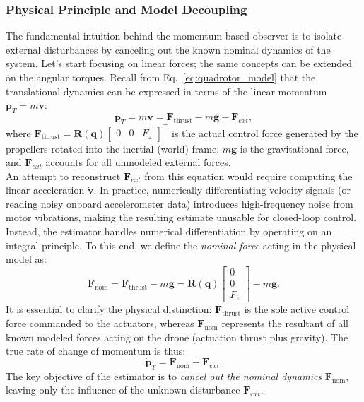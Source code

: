 \subsubsection{Physical Principle and Model Decoupling}
The fundamental intuition behind the momentum-based observer is to isolate external disturbances by canceling out the known nominal dynamics of the system. Let's start focusing on linear forces; the same concepts can be extended on the angular torques. Recall from Eq.~\eqref{eq:quadrotor_model} that the translational dynamics can be expressed in terms of the linear momentum $\mathbf{p}_T = m \mathbf{v}$:
\begin{equation}
    \dot{\mathbf{p}}_T = m \dot{\mathbf{v}} = \mathbf{F}_{\text{thrust}} - m\mathbf{g} + \mathbf{F}_{ext},
\end{equation}
where $\mathbf{F}_{\text{thrust}} = \mathbf{R}(\mathbf{q}) \begin{bmatrix} 0 & 0 & F_z \end{bmatrix}^\top$ is the actual control force generated by the propellers rotated into the inertial (world) frame, $m\mathbf{g}$ is the gravitational force, and $\mathbf{F}_{ext}$ accounts for all unmodeled external forces.
\\An attempt to reconstruct $\mathbf{F}_{ext}$ from this equation would require computing the linear acceleration $\dot{\mathbf{v}}$. In practice, numerically differentiating velocity signals (or reading noisy onboard accelerometer data) introduces high-frequency noise from motor vibrations, making the resulting estimate unusable for closed-loop control.
\\Instead, the estimator handles numerical differentiation by operating on an integral principle. To this end, we define the \textit{nominal force} acting in the physical model as:
\begin{equation} \label{eq:F_nom}
    \mathbf{F}_{\text{nom}} = \mathbf{F}_{\text{thrust}} - m\mathbf{g} = \mathbf{R}(\mathbf{q}) \begin{bmatrix} 0 \\ 0 \\ F_z \end{bmatrix} - m\mathbf{g}.
\end{equation}
It is essential to clarify the physical distinction: $\mathbf{F}_{\text{thrust}}$ is the sole active control force commanded to the actuators, whereas $\mathbf{F}_{\text{nom}}$ represents the resultant of all known modeled forces acting on the drone (actuation thrust plus gravity). The true rate of change of momentum is thus:
\begin{equation}
    \dot{\mathbf{p}}_T = \mathbf{F}_{\text{nom}} + \mathbf{F}_{ext}.
\end{equation}
The key objective of the estimator is to \textit{cancel out the nominal dynamics} $\mathbf{F}_{\text{nom}}$, leaving only the influence of the unknown disturbance $\mathbf{F}_{ext}$.

